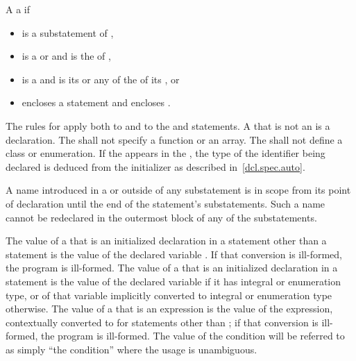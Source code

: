 \pnum
A   
a   if
\begin{itemize}
\item
   is a substatement of ,
\item
   is a  or
   and
   is the  of ,
\item
   is a  and 
  is its  or
  any of the  of
  its , or
\item
   encloses a statement  and  encloses .
\end{itemize}

\pnum
{}%
The rules for  apply both to
 and to the  and 
statements.
A  that is not an  is a
declaration.
The  shall not
specify a function or an array. The  shall not
define a class or enumeration. If the   appears in
the ,
the type of the identifier being declared is deduced from the initializer as described in~\ref{dcl.spec.auto}.

\pnum
{}%
%
\begin{note}
A name introduced in a  or
 outside of any substatement
is in scope from its point of
declaration until the end of the statement's substatements.
Such a name cannot be redeclared in the outermost block of
any of the substatements.
\end{note}

\pnum
The value of a  that is an initialized declaration
in a statement other than a  statement is the value of the
declared variable
.
If that
conversion is ill-formed, the program is ill-formed. The value of a
 that is an initialized declaration in a
 statement is the value of the declared variable if it has
integral or enumeration type, or of that variable implicitly converted
to integral or enumeration type otherwise. The value of a
 that is an expression is the value of the
expression, contextually converted to 
for statements other
than ;
if that conversion is ill-formed, the program is
ill-formed. The value of the condition will be referred to as simply
``the condition'' where the usage is unambiguous.

